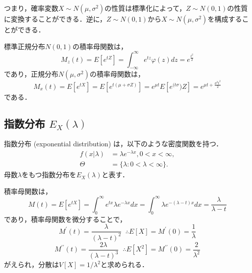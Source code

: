 \documentclass{jsreport}
\begin{document}
つまり，確率変数$X \sim N(\mu, \sigma^2)$の性質は標準化によって，$Z \sim N(0, 1)$の性質に変換することができる．逆に，$Z \sim N(0, 1)$から$X \sim N(\mu, \sigma^2)$を構成することができる．

標準正規分布$N(0, 1)$の積率母関数は，
\begin{equation}
  M_z(t) = E[e^{tZ}] = \int_{-\infty}^{\infty} e^{tz}\varphi(z)dz = e^{\frac{t^2}{2}} \nonumber
\end{equation}
であり，正規分布$N(\mu, \sigma^2)$の積率母関数は，
\begin{equation}
  M_x(t) = E[e^{tX}] = E[e^{t(\mu + \sigma Z)}] = e^{\mu t} E[e^{(t\sigma})Z] = e^{\mu t + \frac{\sigma^2 t^2}{2}} \nonumber
\end{equation}
である．

\subsection{指数分布 $E_X(\lambda)$}
指数分布 (exponential distribution) は，以下のような密度関数を持つ．
\begin{align}
  f(x|\lambda) &= \lambda e^{-\lambda x}, 0 < x < \infty, \nonumber \\
  \Theta &= \{\lambda : 0 < \lambda < \infty\}. \nonumber
\end{align}
母数$\lambda$をもつ指数分布を$E_X(\lambda)$と表す．

積率母関数は，
\begin{equation}
  M(t) = E[e^{tX}] = \int_0^{\infty} e^{tx}\lambda e^{-\lambda x} dx = \int_0^{\infty} \lambda e^{-(\lambda - t)x} dx = \frac{\lambda}{\lambda - t} \nonumber
\end{equation}
であり，積率母関数を微分することで，
\begin{equation}
  M^{\prime}(t) = \frac{\lambda}{(\lambda - t)^2} \; \; \therefore E[X] = M^{\prime}(0) = \frac{1}{\lambda} \nonumber
\end{equation}
\begin{equation}
  M^{\prime \prime} (t) = \frac{2 \lambda}{(\lambda - t)^3} \; \; \therefore E[X^2] = M^{\prime \prime}(0) = \frac{2}{\lambda^2} \nonumber
\end{equation}
がえられ，分散は$V[X] = 1/\lambda^2$と求められる．
\end{document}
